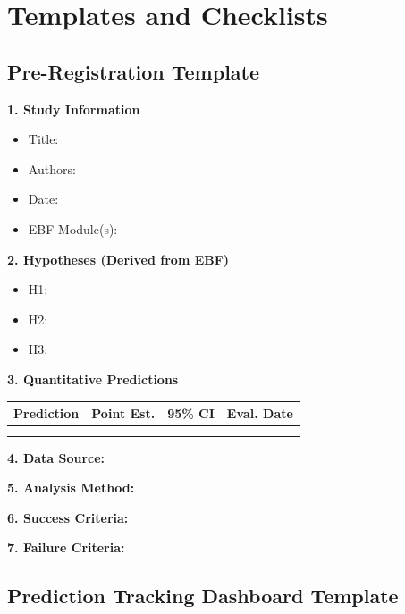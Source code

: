 
\section{Templates and Checklists}
\label{sec:apply-templates}

\subsection{Pre-Registration Template}

\begin{tcolorbox}[colback=gray!5!white, colframe=gray!75!black,
    title=\textbf{EBF Pre-Registration Template}]

\textbf{1. Study Information}
\begin{itemize}[nosep]
    \item Title:
    \item Authors:
    \item Date:
    \item EBF Module(s):
\end{itemize}

\textbf{2. Hypotheses (Derived from EBF)}
\begin{itemize}[nosep]
    \item H1:
    \item H2:
    \item H3:
\end{itemize}

\textbf{3. Quantitative Predictions}

\begin{tabular}{@{}lccc@{}}
\toprule
Prediction & Point Est. & 95\% CI & Eval. Date \\
\midrule
& & & \\
& & & \\
\bottomrule
\end{tabular}

\textbf{4. Data Source:}

\textbf{5. Analysis Method:}

\textbf{6. Success Criteria:}

\textbf{7. Failure Criteria:}

\end{tcolorbox}

\subsection{Prediction Tracking Dashboard Template}

